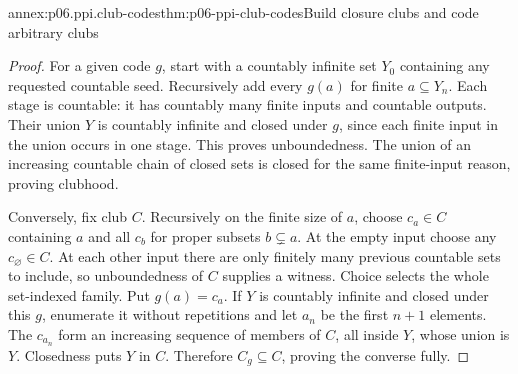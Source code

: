 \begin{annexitem}{annex:p06.ppi.club-codes}{thm:p06-ppi-club-codes}{Build closure clubs and code arbitrary clubs}
\begin{proof}
For a given code \(g\), start with a countably infinite set \(Y_0\)
containing any requested countable seed. Recursively add every
\(g(a)\) for finite \(a\subseteq Y_n\). Each stage is countable:
it has countably many finite inputs and countable outputs. Their union
\(Y\) is countably infinite and closed under \(g\), since each finite
input in the union occurs in one stage. This proves unboundedness.
The union of an increasing countable chain of closed sets is closed
for the same finite-input reason, proving clubhood.

Conversely, fix club \(C\). Recursively on the finite size of \(a\),
choose \(c_a\in C\) containing \(a\) and all \(c_b\) for proper
subsets \(b\subsetneq a\). At the empty input choose any \(c_\varnothing\in C\).
At each other input there are only finitely many previous countable
sets to include, so unboundedness of \(C\) supplies a witness. Choice
selects the whole set-indexed family. Put \(g(a)=c_a\).
If \(Y\) is countably infinite and closed under this \(g\), enumerate
it without repetitions and let \(a_n\) be the first \(n+1\) elements.
The \(c_{a_n}\) form an increasing sequence of members of \(C\),
all inside \(Y\), whose union is \(Y\). Closedness puts \(Y\) in
\(C\). Therefore \(C_g\subseteq C\), proving the converse fully.
\end{proof}
\end{annexitem}

